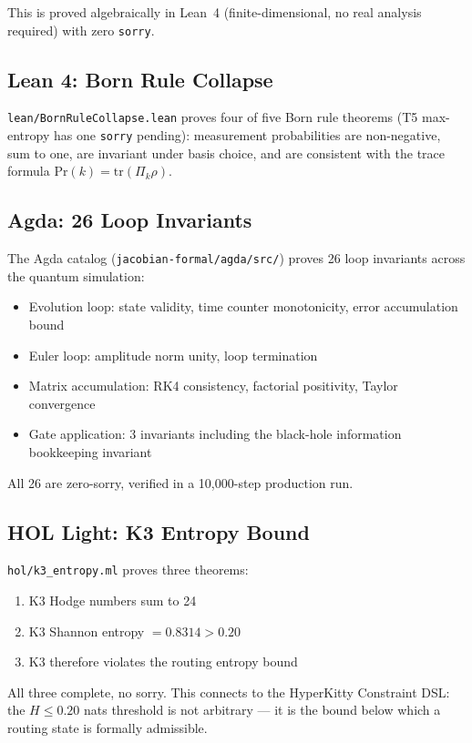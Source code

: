\documentclass[11pt,a4paper]{article}
\begin{document}
This is proved algebraically in Lean~4 (finite-dimensional, no
real analysis required) with zero \texttt{sorry}.

\subsection{Lean 4: Born Rule Collapse}

\texttt{lean/BornRuleCollapse.lean} proves four of five Born rule
theorems (T5 max-entropy has one \texttt{sorry} pending):
measurement probabilities are non-negative, sum to one, are invariant
under basis choice, and are consistent with the trace formula
$\mathrm{Pr}(k) = \mathrm{tr}(\Pi_k \rho)$.

\subsection{Agda: 26 Loop Invariants}

The Agda catalog (\texttt{jacobian-formal/agda/src/}) proves 26 loop
invariants across the quantum simulation:
\begin{itemize}[noitemsep]
\item Evolution loop: state validity, time counter monotonicity,
  error accumulation bound
\item Euler loop: amplitude norm unity, loop termination
\item Matrix accumulation: RK4 consistency, factorial positivity,
  Taylor convergence
\item Gate application: 3 invariants including the black-hole
  information bookkeeping invariant
\end{itemize}

All 26 are zero-sorry, verified in a 10,000-step production run.

\subsection{HOL Light: K3 Entropy Bound}

\texttt{hol/k3\_entropy.ml} proves three theorems:
\begin{enumerate}[noitemsep]
\item K3 Hodge numbers sum to 24
\item K3 Shannon entropy $= 0.8314 > 0.20$
\item K3 therefore violates the routing entropy bound
\end{enumerate}

All three complete, no sorry. This connects to the HyperKitty Constraint
DSL: the $H \leq 0.20$ nats threshold is not arbitrary --- it is the
bound below which a routing state is formally admissible.
\end{document}

